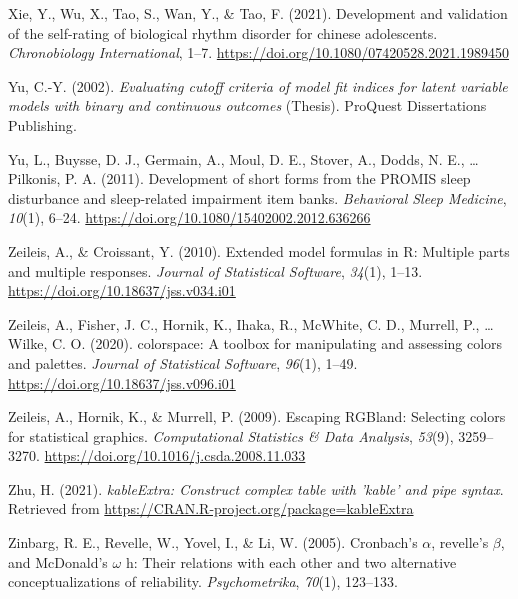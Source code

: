 \documentclass[
  english,
  man]{apa6}
\newlength{\cslhangindent}
\newlength{\cslentryspacingunit} %
\newenvironment{CSLReferences}[2] %
 {%
  \setlength{\parindent}{0pt}
  \ifodd #1
  \let\oldpar\par
  \def\par{\hangindent=\cslhangindent\oldpar}
  \fi
  \setlength{\parskip}{#2\cslentryspacingunit}
 }%
 {}
\begin{document}
\begin{CSLReferences}{1}{0}
\leavevmode{}%
Xie, Y., Wu, X., Tao, S., Wan, Y., \& Tao, F. (2021). Development and validation of the self-rating of biological rhythm disorder for chinese adolescents. \emph{Chronobiology International}, 1--7. \url{https://doi.org/10.1080/07420528.2021.1989450}

\leavevmode{}%
Yu, C.-Y. (2002). \emph{Evaluating cutoff criteria of model fit indices for latent variable models with binary and continuous outcomes} (Thesis). {ProQuest Dissertations Publishing}.

\leavevmode{}%
Yu, L., Buysse, D. J., Germain, A., Moul, D. E., Stover, A., Dodds, N. E., \ldots{} Pilkonis, P. A. (2011). Development of short forms from the PROMIS{\texttrademark} sleep disturbance and sleep-related impairment item banks. \emph{Behavioral Sleep Medicine}, \emph{10}(1), 6--24. \url{https://doi.org/10.1080/15402002.2012.636266}

\leavevmode{}%
Zeileis, A., \& Croissant, Y. (2010). Extended model formulas in {R}: Multiple parts and multiple responses. \emph{Journal of Statistical Software}, \emph{34}(1), 1--13. \url{https://doi.org/10.18637/jss.v034.i01}

\leavevmode{}%
Zeileis, A., Fisher, J. C., Hornik, K., Ihaka, R., McWhite, C. D., Murrell, P., \ldots{} Wilke, C. O. (2020). {colorspace}: A toolbox for manipulating and assessing colors and palettes. \emph{Journal of Statistical Software}, \emph{96}(1), 1--49. \url{https://doi.org/10.18637/jss.v096.i01}

\leavevmode{}%
Zeileis, A., Hornik, K., \& Murrell, P. (2009). Escaping {RGB}land: Selecting colors for statistical graphics. \emph{Computational Statistics \& Data Analysis}, \emph{53}(9), 3259--3270. \url{https://doi.org/10.1016/j.csda.2008.11.033}

\leavevmode{}%
Zhu, H. (2021). \emph{kableExtra: Construct complex table with 'kable' and pipe syntax}. Retrieved from \url{https://CRAN.R-project.org/package=kableExtra}

\leavevmode{}%
Zinbarg, R. E., Revelle, W., Yovel, I., \& Li, W. (2005). Cronbach's \(\alpha\), revelle's \(\beta\), and McDonald's \(\omega\) h: Their relations with each other and two alternative conceptualizations of reliability. \emph{Psychometrika}, \emph{70}(1), 123--133.

\end{CSLReferences}
\end{document}
